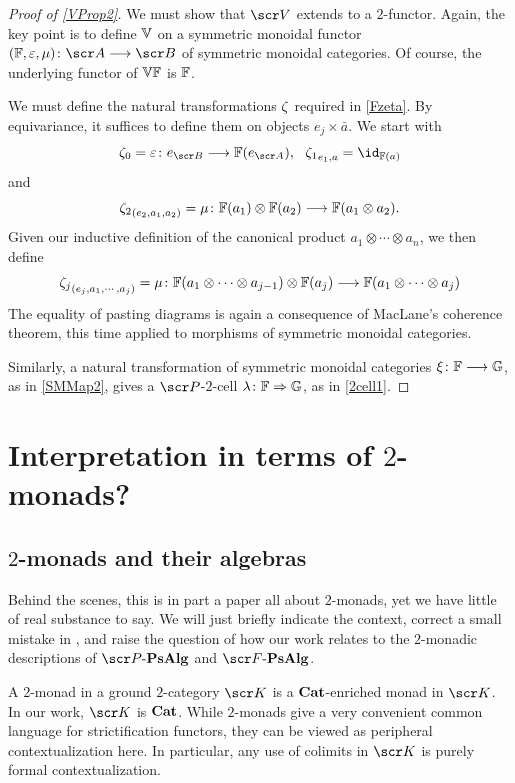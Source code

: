 \documentclass{amsart}
\theoremstyle{definition}
\numberwithin{equation}{section}
\newcommand{\PPs}{\sP\text{-}\mathbf{PsAlg}}
\newcommand{\FP}{\sF\text{-}\mathbf{PsAlg}}
\begin{document}
\begin{proof}[Proof of \autoref{VProp2}]  We must show that $\sV$ extends to a $2$-functor. Again, the key point is to define $\mathbb{V}$ on a symmetric monoidal functor $(\bF,\epz, \mu)\colon \sA \rtarr \sB$ of symmetric monoidal categories.   Of course, the underlying functor of $\mathbb{V}\mathbb{F}$ is $\mathbb{F}$.  

We must define the natural transformations $\zeta$ required in \autoref{Fzeta}.  By equivariance, it suffices to define them on objects $e_j\times \bar{a}$.  We start with 
$$\ze_0= \epz\colon e_{\sB} \rtarr \bF(e_{\sA}), \ \ {\ze_1}_{e_1, a} = \id_{\bF(a)}$$ 
and 
$${\zeta_2}_{(e_2,a_1, a_2)} = \mu\colon \mathbb{F}(a_1)\otimes \mathbb{F}(a_2) \longrightarrow \mathbb{F}(a_1\otimes a_2).$$
Given our inductive definition of the canonical product $a_1\otimes \cdots\otimes a_n$, we then define
$${\zeta_j}_{(e_j,a_1, \cdots, a_j)} = \mu\colon \mathbb{F}(a_1\otimes \cdots \otimes a_{j-1}) \otimes \mathbb{F}(a_j) 
\longrightarrow \mathbb{F}(a_1\otimes \cdots \otimes a_j)$$
The equality of pasting diagrams is again a consequence of MacLane's coherence theorem, this time applied to morphisms of symmetric monoidal categories.

Similarly, a natural transformation of symmetric monoidal categories $\xi\colon \mathbb{F} \longrightarrow \mathbb{G}$, as in \autoref{SMMap2},  gives a $\sP$-$2$-cell $\lambda\colon \mathbb{F} \Rightarrow \mathbb{G}$, as in \autoref{2cell1}.
\end{proof}

\section{Interpretation in terms of $2$-monads?}\label{Sec5}

\subsection{$2$-monads and their algebras} 

Behind the scenes, this is in part a paper all about $2$-monads, yet we have little of real substance to say.  We will just briefly indicate the context,  correct a small mistake in \cite{GMMO2},  and raise the  question of how our work relates to the $2$-monadic descriptions of $\PPs$ and $\FP$.

A $2$-monad in a ground $2$-category $\sK$ is a $\bf{Cat}$-enriched monad in $\sK$.   In our work,  $\sK$ is $\bf{Cat}$.  While $2$-monads give a very convenient common language for strictification functors, they can be viewed as peripheral contextualization here.   In particular, any use of colimits in $\sK$ is purely formal contextualization. 
\end{document}
